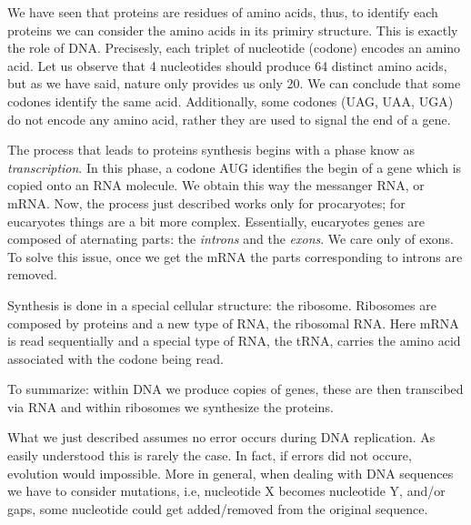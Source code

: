\documentclass{subfiles}
\begin{document}
    We have seen that proteins are residues of amino acids, thus, to identify each proteins
        we can consider the amino acids in its primiry structure. This is exactly the role of DNA.
        Precisesly, each triplet of nucleotide (codone) encodes an amino acid.
        Let us observe that 4 nucleotides should produce 64 distinct amino acids,
        but as we have said, nature only provides us only 20. We can conclude that some codones identify the same acid.
        Additionally, some codones (UAG, UAA, UGA) do not encode any amino acid, 
        rather they are used to signal the end of a gene. 

    The process that leads to proteins synthesis begins with a phase know as \emph{transcription}.
        In this phase, a codone AUG identifies the begin of a gene which is copied onto an RNA molecule.
        We obtain this way the messanger RNA, or mRNA. Now, the process just described works only for 
        procaryotes; for eucaryotes things are a bit more complex. Essentially,
        eucaryotes genes are composed of aternating parts: the \emph{introns} and the \emph{exons}.
        We care only of exons. To solve this issue, once we get the mRNA the parts corresponding to introns are removed.

    Synthesis is done in a special cellular structure: the ribosome. 
        Ribosomes are composed by proteins and a new type of RNA, the ribosomal RNA.
        Here mRNA is read sequentially and a special type of RNA, the tRNA,
        carries the amino acid associated with the codone being read.

    To summarize: within DNA we produce copies of genes, 
        these are then transcibed via RNA and within ribosomes we synthesize the proteins.

    What we just described assumes no error occurs during DNA replication.
        As easily understood this is rarely the case. In fact, if errors did not occure,
        evolution would impossible. More in general, when dealing with DNA sequences we have to consider 
        mutations, i.e, nucleotide X becomes nucleotide Y, and/or gaps, 
        some nucleotide could get added/removed from the original sequence.
\end{document}
